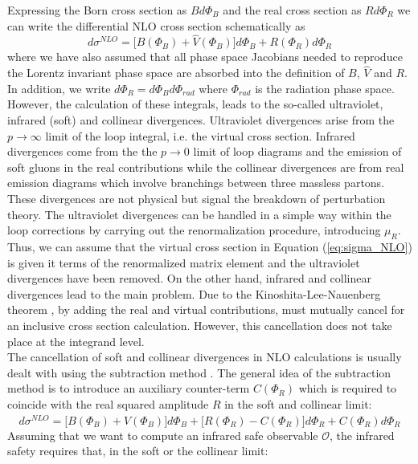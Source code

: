 \indent Expressing the Born cross section as $Bd\Phi_B$ and the real cross section as $Rd\Phi_R$ we can write the differential NLO cross section schematically as
\begin{equation}
    d\sigma^{NLO} = \big[ B(\Phi_B) + \hat{V}(\Phi_B)\big]d\Phi_B + R(\Phi_R)d\Phi_R
\end{equation}
where we have also assumed that all phase space Jacobians needed to reproduce the Lorentz invariant phase space are absorbed into the definition of $B$, $\hat{V}$ and $R$. In addition, we write $d\Phi_R = d\Phi_Bd\Phi_{rad}$ where $\Phi_{rad}$ is the radiation phase space.\\
\indent However, the calculation of these integrals, leads to the so-called ultraviolet, infrared (soft) and collinear divergences. Ultraviolet divergences arise from the $p \rightarrow \infty$ limit of the loop integral, i.e. the virtual cross section. Infrared divergences come from the the $p \rightarrow 0$ limit of loop diagrams and the emission of soft gluons in the real contributions while the collinear divergences are from real emission diagrams which involve branchings between three massless partons. These divergences are not physical but signal the breakdown of perturbation theory. The ultraviolet divergences can be handled in a simple way within the loop corrections by carrying out the renormalization procedure, introducing $\mu_R$. Thus, we can assume that the virtual cross section in Equation (\ref{eq:sigma_NLO}) is given it terms of the renormalized matrix element and the ultraviolet divergences have been removed. On the other hand, infrared and collinear divergences lead to the main problem. Due to the Kinoshita-Lee-Nauenberg theorem \cite{61,62}, by adding the real and virtual contributions, must mutually cancel for an inclusive cross section calculation. However, this cancellation does not take place at the integrand level. \\
\indent The cancellation of soft and collinear divergences in NLO calculations is usually dealt with using the subtraction method \cite{Catani_1997}. The general idea of the subtraction method is to introduce an auxiliary counter-term $C(\Phi_R)$ which is required to coincide with the real squared amplitude $R$ in the soft and collinear limit:
\begin{equation}
    d\sigma^{NLO} = \big[ B(\Phi_B) + \hat{V}(\Phi_B)\big]d\Phi_B + \big[R(\Phi_R) - C(\Phi_R)\big]d\Phi_R + C(\Phi_R)d\Phi_R
\end{equation}
Assuming that we want to compute an infrared safe observable $\mathscr{O}$, the infrared safety requires that, in the soft or the collinear limit:  
